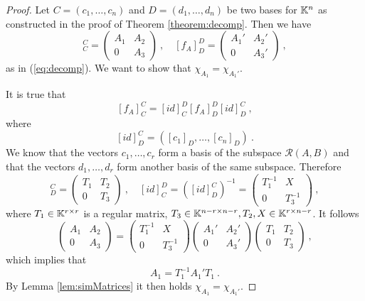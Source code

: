 \begin{proof}
	Let $C=(c_1,\ldots,c_n)$ and $D=(d_1,\ldots,d_n)$ be two bases for $\mathbb{K}^n$ as constructed in the proof of Theorem \ref{theorem:decomp}. Then we have 
	\begin{equation*}
		[f_A]^C_C=
		\begin{pmatrix}
			A_1 & A_2 \\
			0   & A_3
		\end{pmatrix}\ ,
		\quad
		[f_A]^D_D=
		\begin{pmatrix}
			A_1' & A_2' \\
			0    & A_3'
		\end{pmatrix}\ ,
	\end{equation*}
	as in (\ref{eq:decomp}).
	We want to show that $\chi_{A_1}=\chi_{A_1'}$.

	It is true that
	$$[f_A]^C_C=[id]^D_C[f_A]^D_D[id]^C_D\ ,$$
	where
	$$[id]^C_D=([c_1]_D,\ldots,[c_n]_D)\ .$$
	We know that the vectors $c_1,\ldots,c_r$ form a basis of the subspace $\mathcal{R}(A,B)$ and that the vectors $d_1,\ldots,d_r$ form another basis of the same subspace. Therefore
	\begin{equation*}
		[id]^C_D=
		\begin{pmatrix}
			T_1 & T_2 \\
			0   & T_3
		\end{pmatrix}\ ,
		\quad
		[id]^D_C=([id]^C_D)^{-1}=
		\begin{pmatrix}
			T_1^{-1} & X \\
			0        & T_3^{-1}
		\end{pmatrix}\ ,
	\end{equation*}
	where $T_1\in\mathbb{K}^{r\times r}$ is a regular matrix, $T_3\in\mathbb{K}^{n-r\times n-r},T_2,X\in\mathbb{K}^{r\times n-r}$. It follows 
	\begin{equation*}
		\begin{pmatrix}
			A_1 & A_2 \\
			0   & A_3
		\end{pmatrix}
		=
		\begin{pmatrix}
			T_1^{-1} & X \\
			0        & T_3^{-1}
		\end{pmatrix}
		\begin{pmatrix}
			A_1' & A_2' \\
			0    & A_3'
		\end{pmatrix}
		\begin{pmatrix}
			T_1 & T_2 \\
			0   & T_3
		\end{pmatrix}\ ,
	\end{equation*}
	which implies that
	$$A_1=T_1^{-1}A_1'T_1\ .$$
	By Lemma \ref{lem:simMatrices} it then holds $\chi_{A_1}=\chi_{A_1'}$.
\end{proof}